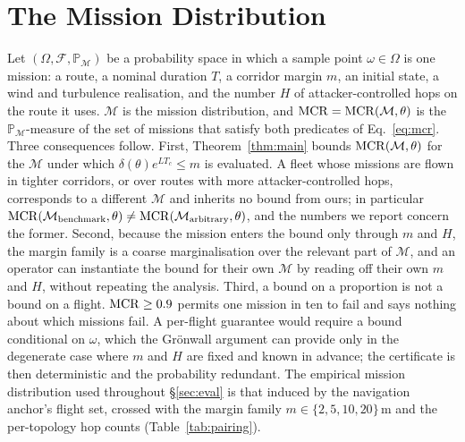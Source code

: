 \section{The Mission Distribution}
\label{app:probspace}
\label{sec:missiondist}
Let $(\Omega,\mathcal{F},\mathbb{P}_{\mathcal{M}})$ be a probability space in
which a sample point $\omega\in\Omega$ is one mission: a route, a nominal
duration $T$, a corridor margin $m$, an initial state, a wind and turbulence
realisation, and the number $H$ of attacker-controlled hops on the route it
uses. $\mathcal{M}$ is the mission distribution, and
$\mathrm{MCR}=\mathrm{MCR}(\mathcal{M},\theta)$ is the $\mathbb{P}_{\mathcal{M}}$-measure of the
set of missions that satisfy both predicates of Eq.~\eqref{eq:mcr}. Three
consequences follow. First, Theorem~\ref{thm:main} bounds
$\mathrm{MCR}(\mathcal{M},\theta)$ for the $\mathcal{M}$ under which
$\delta(\theta)e^{LT_c}\le m$ is evaluated. A fleet whose missions are flown in
tighter corridors, or over routes with more attacker-controlled hops,
corresponds to a different $\mathcal{M}$ and inherits no bound from ours; in
particular
$\mathrm{MCR}(\mathcal{M}_{\text{benchmark}},\theta)\neq\mathrm{MCR}(\mathcal{M}_{\text{arbitrary}},\theta)$,
and the numbers we report concern the former. Second, because the mission
enters the bound only through $m$ and $H$, the margin family is a coarse
marginalisation over the relevant part of $\mathcal{M}$, and an operator can
instantiate the bound for their own $\mathcal{M}$ by reading off their own $m$
and $H$, without repeating the analysis. Third, a bound on a proportion is not a
bound on a flight. $\mathrm{MCR}\ge0.9$ permits one mission in ten to fail and says
nothing about which missions fail. A per-flight guarantee would require a bound
conditional on $\omega$, which the Gr\"onwall argument can provide only in the
degenerate case where $m$ and $H$ are fixed and known in advance; the
certificate is then deterministic and the probability redundant. The empirical
mission distribution used throughout \S\ref{sec:eval} is that induced by the
navigation anchor's flight set, crossed with the margin family
$m\in\{2,5,10,20\}$\,m and the per-topology hop counts
(Table~\ref{tab:pairing}).

